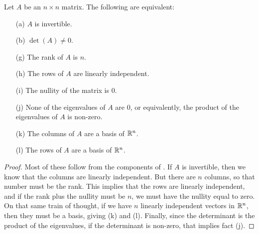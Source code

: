 \documentclass{ximera}
\begin{document}
\begin{theorem}{}
    \label{thm:bigLinAlg2}
    Let $A$ be an $n \times n$ matrix. The following are equivalent:
    \begin{enumerate}
        \item[(a)] $A$ is invertible.
        \item[(b)] $\det(A) \neq 0$.
        \item[(g)] The rank of $A$ is $n$.
        \item[(h)] The rows of $A$ are linearly independent.
        \item[(i)] The nullity of the matrix is $0$.
        \item[(j)] None of the eigenvalues of $A$ are $0$, or equivalently, the product of the eigenvalues of $A$ is non-zero.
        \item[(k)] The columns of $A$ are a basis of $\mathbb{R}^n$.
        \item[(l)] The rows of $A$ are a basis of $\mathbb{R}^n$.  
    \end{enumerate}
\end{theorem}

\begin{proof}
    Most of these follow from the components of . If $A$ is invertible, then we know that the columns are linearly independent. But there are $n$ columns, so that number must be the rank. This implies that the rows are linearly independent, and if the rank plus the nullity must be $n$, we must have the nullity equal to zero. On that same train of thought, if we have $n$ linearly independent vectors in $\mathbb{R}^n$, then they must be a basis, giving (k) and (l). Finally, since the determinant is the product of the eigenvalues, if the determinant is non-zero, that implies fact (j). 
\end{proof}
\end{document}
